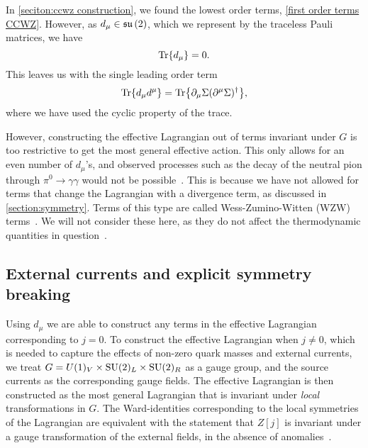 In \autoref{seciton:ccwz construction}, we found the lowest order terms, \cref{first order terms CCWZ}.
However, as $d_\mu \in \mathfrak{su}\left(2\right)$, which we represent by the traceless Pauli matrices, we have
\begin{equation}
    \Tr{d_\mu} = 0.
\end{equation}
This leaves us with the single leading order term
\begin{equation}
    \Tr{d_\mu d^\mu} = \Tr{\partial_\mu \Sigma (\partial^\mu \Sigma)^\dagger},
\end{equation}
where we have used the cyclic property of the trace.

However, constructing the effective Lagrangian out of terms invariant under $G$ is too restrictive to get the most general effective action.
This only allows for an even number of $d_\mu$'s, and observed processes such as the decay of the neutral pion through $\pi^0 \rightarrow \gamma \gamma$ would not be possible~\cite{Scherer2002IntroductionTC}.
This is because we have not allowed for terms that change the Lagrangian with a divergence term, as discussed in \autoref{section:symmetry}.
Terms of this type are called Wess-Zumino-Witten (WZW) terms~\cite{weinberg_1996_vol2}.
We will not consider these here, as they do not affect the thermodynamic quantities in question~\cite{Andersen:two-flavor-chpt}.

\subsection*{External currents and explicit symmetry breaking}
\label{Covarinat derivative}

Using $d_\mu$ we are able to construct any terms in the effective Lagrangian corresponding to $j=0$.
To construct the effective Lagrangian when $j \neq 0$, which is needed to capture the effects of non-zero quark masses and external currents, we treat $G =  U(1)_V \times \mathrm{SU}(2)_L\times \mathrm{SU}(2)_R$ as a gauge group, and the source currents as the corresponding gauge fields.
The effective Lagrangian is then constructed as the most general Lagrangian that is invariant under \emph{local} transformations in $G$.
The Ward-identities corresponding to the local symmetries of the Lagrangian are equivalent with the statement that $Z[j]$ is invariant under a gauge transformation of the external fields, in the absence of anomalies~\cite{Leutwyler:on_the_fundations}.

